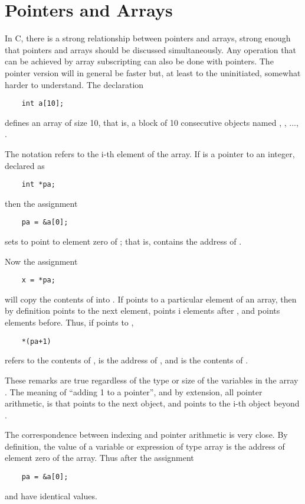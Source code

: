 \section{Pointers and Arrays}
In C, there is a strong relationship between pointers and arrays, strong enough that pointers and arrays should be discussed simultaneously.
Any operation that can be achieved by array subscripting can also be done with pointers. The pointer version will in general be faster but, at least to the uninitiated, somewhat harder to understand.
The declaration
\begin{lstlisting}
    int a[10];
\end{lstlisting}
defines an array of size 10, that is, a block of 10 consecutive objects named , , ..., .

The notation  refers to the i-th element of the array. If  is a pointer to an integer, declared as
\begin{lstlisting}
    int *pa;
\end{lstlisting}
then the assignment
\begin{lstlisting}
    pa = &a[0];
\end{lstlisting}
sets  to point to element zero of ; that is,  contains the address of .

Now the assignment
\begin{lstlisting}
    x = *pa;
\end{lstlisting}
will copy the contents of  into .
If  points to a particular element of an array, then by definition  points to the next element,  points i elements after , and  points  elements before.
Thus, if  points to ,
\begin{lstlisting}
    *(pa+1)
\end{lstlisting}
refers to the contents of ,  is the address of , and  is the contents of .

These remarks are true regardless of the type or size of the variables in the array .
The meaning of ``adding 1 to a pointer'', and by extension, all pointer arithmetic, is that  points to the next object, and  points to the i-th object beyond .

The correspondence between indexing and pointer arithmetic is very close. By definition, the value of a variable or expression of type array is the address of element zero of the array.
Thus after the assignment
\begin{lstlisting}
    pa = &a[0];
\end{lstlisting}
 and  have identical values.

